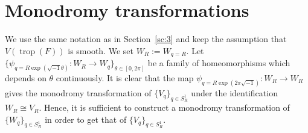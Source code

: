 \documentclass[pdftex]{sigma}
\numberwithin{equation}{section}
\begin{document}
\section{Monodromy transformations}\label{sc:4}

We use the same notation as in Section~\ref{sc:3} and keep the assumption that $V(\operatorname{trop}(F))$ is smooth. We set $W_R:=W_{q=R}$. Let $\{\psi_{q=R\exp(\sqrt{-1}\theta)} \colon W_R \to W_q\}_{\theta \in [0,2\pi]}$ be a family of homeomorphisms which depends on $\theta$ continuously. It is clear that the map $\psi_{q=R\exp(2 \pi \sqrt{-1})} \colon W_R \to W_R$ gives the monodromy transformation of $\{V_q\}_{q \in S_R^1}$ under the identif\/ication $W_R \cong V_R$. Hence, it is suf\/f\/icient to construct a monodromy transformation of $\{W_q\}_{q \in S_R^1}$ in order to get that of $\{V_q\}_{q \in S_R^1}$.
\end{document}
